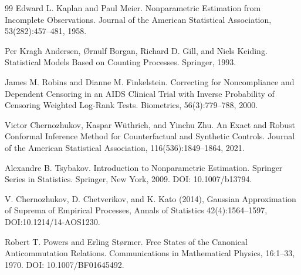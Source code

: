 \documentclass{article}
\begin{document}
\begin{thebibliography}{99}
   Edward L. Kaplan and Paul Meier. Nonparametric Estimation from Incomplete Observations. Journal of the American Statistical Association, 53(282):457--481, 1958.

   Per Kragh Andersen, Ørnulf Borgan, Richard D. Gill, and Niels Keiding. Statistical Models Based on Counting Processes. Springer, 1993.

   James M. Robins and Dianne M. Finkelstein. Correcting for Noncompliance and Dependent Censoring in an AIDS Clinical Trial with Inverse Probability of Censoring Weighted Log-Rank Tests. Biometrics, 56(3):779--788, 2000.

   Victor Chernozhukov, Kaspar Wüthrich, and Yinchu Zhu. An Exact and Robust Conformal Inference Method for Counterfactual and Synthetic Controls. Journal of the American Statistical Association, 116(536):1849--1864, 2021.

   Alexandre B. Tsybakov. Introduction to Nonparametric Estimation. Springer Series in Statistics. Springer, New York, 2009. DOI: 10.1007/b13794.

   V. Chernozhukov, D. Chetverikov, and K. Kato (2014), Gaussian Approximation of Suprema of Empirical Processes, Annals of Statistics 42(4):1564--1597, DOI:10.1214/14-AOS1230.

   Robert T. Powers and Erling St{\o}rmer. Free States of the Canonical Anticommutation Relations. Communications in Mathematical Physics, 16:1--33, 1970. DOI: 10.1007/BF01645492.

\end{thebibliography}
\end{document}
